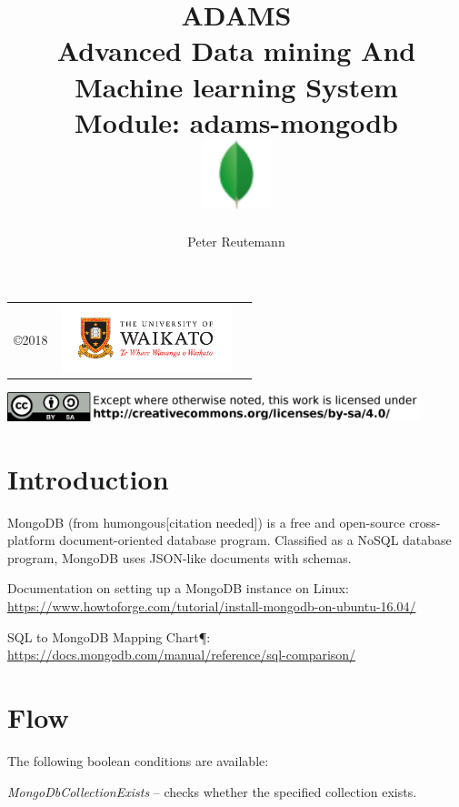 \documentclass[a4paper]{book}
\title{
  \textbf{ADAMS} \\
  {\Large \textbf{A}dvanced \textbf{D}ata mining \textbf{A}nd \textbf{M}achine
  learning \textbf{S}ystem} \\
  {\Large Module: adams-mongodb} \\
  \vspace{1cm}
  \includegraphics[width=2cm]{images/mongodb-module.png} \\
}
\author{
  Peter Reutemann
}
\begin{document}
\begin{titlepage}
\maketitle

\thispagestyle{empty}
\center
\begin{table}[b]
	\begin{tabular}{c l l}
		\parbox[c][2cm]{2cm}{\copyright 2018} &
		\parbox[c][2cm]{5cm}{\includegraphics[width=5cm]{images/coat_of_arms.pdf}} \\
	\end{tabular}
	\includegraphics[width=12cm]{images/cc.png} \\
\end{table}

\end{titlepage}

\tableofcontents

\chapter{Introduction}
MongoDB (from humongous[citation needed]) is a free and open-source cross-platform
document-oriented database program. Classified as a NoSQL\cite{nosql} database program,
MongoDB uses JSON-like\cite{json} documents with schemas.

\begin{tight_itemize}
  \item Documentation on setting up a MongoDB instance on Linux: \\
    \url{https://www.howtoforge.com/tutorial/install-mongodb-on-ubuntu-16.04/}{}
  \item SQL to MongoDB Mapping Chart¶: \\
    \url{https://docs.mongodb.com/manual/reference/sql-comparison/}{}
\end{tight_itemize}

\chapter{Flow}
The following boolean conditions are available:
\begin{tight_itemize}
  \item \textit{MongoDbCollectionExists} -- checks whether the specified collection exists.
\end{tight_itemize}
\end{document}
